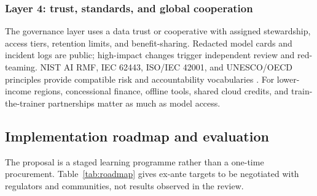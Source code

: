 \documentclass[12pt]{article}
\begin{document}
\subsubsection{Layer 4: trust, standards, and global cooperation}
The governance layer uses a data trust or cooperative with assigned stewardship, access tiers, retention limits, and benefit-sharing. Redacted model cards and incident logs are public; high-impact changes trigger independent review and red-teaming. NIST AI RMF, IEC 62443, ISO/IEC 42001, and UNESCO/OECD principles provide compatible risk and accountability vocabularies \citep{nist2023,iec62443,iso42001,unesco2021,oecd2019}. For lower-income regions, concessional finance, offline tools, shared cloud credits, and train-the-trainer partnerships matter as much as model access.

\subsection{Implementation roadmap and evaluation}
The proposal is a staged learning programme rather than a one-time procurement. Table~\ref{tab:roadmap} gives ex-ante targets to be negotiated with regulators and communities, not results observed in the review.
\end{document}
